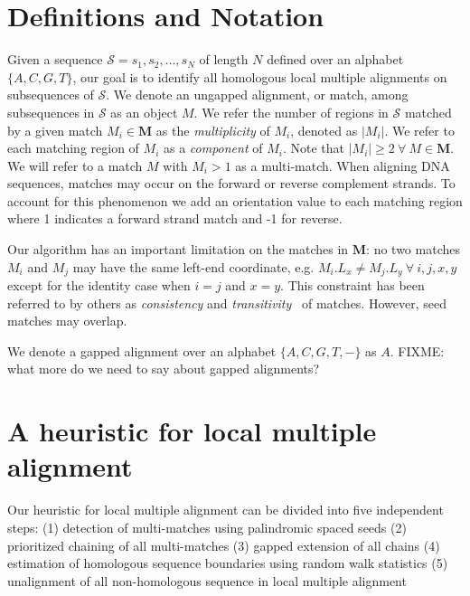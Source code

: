 \documentclass{llncs}
\begin{document}
\section{Definitions and Notation}

Given a sequence $\mathcal{S}=s_1, s_2,\dots, s_N$ of length $N$
defined over an alphabet $\{A,C,G,T\}$, our goal is to identify all homologous
local multiple alignments on subsequences of $\mathcal{S}$. We denote
an ungapped alignment, or match, among subsequences in $\mathcal{S}$
as an object $M$.  We refer the number of regions in $\mathcal{S}$
matched by a given match $M_i \in \mathbf{M}$ as the
\textit{multiplicity} of $M_i$, denoted as $|M_i|$. We refer to each
matching region of $M_i$ as a \textit{component} of $M_i$. Note that
$|M_i| \geq 2~\forall~M \in \mathbf{M}$. We will refer to a match $M$ with $M_i>1$ as a multi-match.
When aligning DNA sequences, matches may occur on the forward or reverse complement strands. To account for
this phenomenon we add an orientation value to each matching region
where 1 indicates a forward strand match and -1 for reverse.

Our algorithm has an important limitation on the matches in
$\mathbf{M}$: no two matches $M_i$ and $M_j$ may have the same
left-end coordinate, e.g. $M_i.L_x \neq M_j.L_y~\forall~i, j, x, y$
except for the identity case when $i=j$ and $x=y$.  This constraint
has been referred to by others as \textit{consistency} and
\textit{transitivity}~\cite{ref-transitivity} of matches.  However, seed matches may overlap.

We denote a gapped alignment over an alphabet $\{A,C,G,T,-\}$ as $A$. FIXME: what more do we need to say about gapped alignments?

\section{A heuristic for local multiple alignment}

Our heuristic for local multiple alignment
can be divided into five independent steps:
(1) detection of multi-matches using palindromic spaced seeds
(2) prioritized chaining of all multi-matches
(3) gapped extension of all chains
(4) estimation of homologous sequence boundaries using random walk statistics
(5) unalignment of all non-homologous sequence in local multiple alignment
\end{document}
